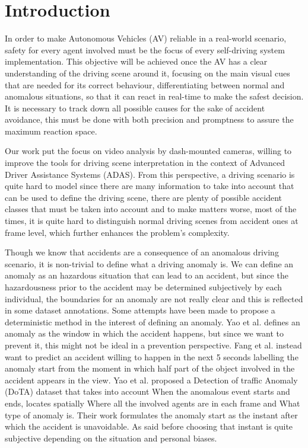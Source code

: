 \section{Introduction}

In order to make Autonomous Vehicles (AV) reliable in a real-world scenario, safety for every agent involved must be the focus of every self-driving system implementation.
This objective will be achieved once the AV has a clear understanding of the driving scene around it, focusing on the main visual cues that are needed for its correct behaviour, differentiating between normal and anomalous situations, so that it can react in real-time to make the safest decision.
It is necessary to track down all possible causes for the sake of accident avoidance, this must be done with both precision and promptness to assure the maximum reaction space.

Our work put the focus on video analysis by dash-mounted cameras, willing to improve the tools for driving scene interpretation in the context of Advanced Driver Assistance Systems (ADAS).
From this perspective, a driving scenario is quite hard to model since there are many information to take into account that can be used to define the driving scene, there are plenty of possible accident classes that must be taken into account and to make matters worse, most of the times, it is quite hard to distinguish normal driving scenes from accident ones at frame level, which further enhances the problem's complexity.

Though we know that accidents are a consequence of an anomalous driving scenario, it is non-trivial to define what a driving anomaly is.
We can define an anomaly as an hazardous situation that can lead to an accident, but since the hazardousness prior to the accident may be determined subjectively by each individual, the boundaries for an anomaly are not really clear and this is reflected in some dataset annotations.
Some attempts have been made to propose a deterministic method in the interest of defining an anomaly.
Yao et al. \cite{yao2019unsupervised} defines an anomaly as the window in which the accident happens, but since we want to prevent it, this might not be ideal in a prevention perspective.
Fang et al. \cite{fang2019dada} instead want to predict an accident willing to happen in the next 5 seconds labelling the anomaly start from the moment in which half part of the object involved in the accident appears in the view.
Yao et al. \cite{yao2020when} proposed a Detection of traffic Anomaly (DoTA) dataset that takes into account When the anomalous event starts and ends, locates spatially Where all the involved agents are in each frame and What type of anomaly is.
Their work formulates the anomaly start as the instant after which the accident is unavoidable.
As said before choosing that instant is quite subjective depending on the situation and personal biases.

